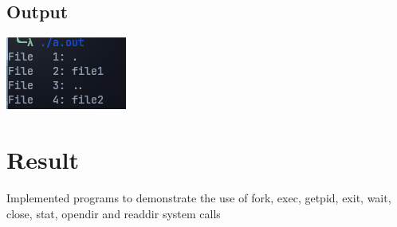 \subsection{Output}
\includegraphics[width=0.5\linewidth]{Cycle_1//Outputs/opendir.png}


\section*{Result}
Implemented programs to demonstrate the use of fork, exec, getpid, exit, wait,
close, stat, opendir and readdir system calls